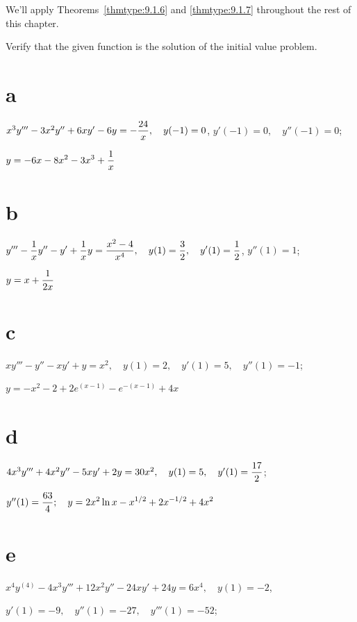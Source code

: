 We'll apply Theorems~\ref{thmtype:9.1.6} and \ref{thmtype:9.1.7} throughout the rest of this
chapter.

\exercises

\begin{exerciselist}
  \item\label{exer:9.1.1} Verify that the given function is the solution of the initial value
        problem.

\part{a} $x^{3}y'''-3x^{2}y''+6xy'-6y=-\displaystyle\frac{24}{x},\quad y(-1)=0$, $y'(-1)=0,\quad y''(-1)=0$;

  \hspace*{15pt}$\displaystyle{y=-6x-8x^{2}-3x^{3}+\frac{1}{x}}$

\part{b}
$\displaystyle{y'''-\frac{1}{x}y''-y'+\frac{1}{x}y=\frac{x^{2}-4}{x^{4}},\quad y(1)=\frac{3}{2},\quad y'(1)=\frac{1}{2}}$,
$y''(1)=1$;

  \hspace*{15pt} $y=x+\displaystyle\frac{1}{2x}$

\part{c} $xy'''-y''-xy'+y=x^{2},\quad y(1)=2,\quad y'(1)=5,\quad y''(1)=-1$;

  \hspace*{15pt} $y=-x^{2}-2+2e^{(x-1)}-e^{-(x-1)}+4x$

\part{d} $4x^{3}y'''+4x^{2}y''-5xy'+2y=30x^{2},\quad y(1)=5,\quad y'(1)=\displaystyle\frac{17}{2}$;

  \hspace*{15pt} $y''(1)=\displaystyle\frac{63}{4};\quad y=2x^{2}\ln x-x^{1/2}+2x^{-1/2}+4x^{2}$

\part{e} $x^{4}y^{(4)}-4x^{3}y'''+12x^{2}y''-24xy'+24y=6x^{4},\quad y(1)=-2$,

  \hspace*{15pt} $y'(1)=-9,\quad y''(1)=-27,\quad y'''(1)=-52$;


\end{exerciselist}
